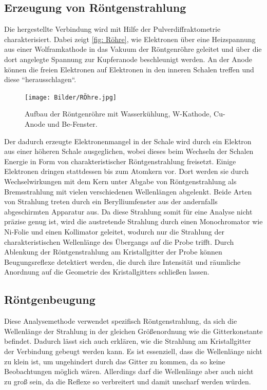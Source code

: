 \documentclass[a4paper,12pt,bibliography=totocnumbered]{scrartcl}
\begin{document}
\subsection{Erzeugung von Röntgenstrahlung}
Die hergestellte Verbindung wird mit Hilfe der Pulverdiffraktometrie charakterisiert.
Dabei zeigt \autoref{fig: Röhre}, wie Elektronen über eine Heizspannung aus einer Wolframkathode in das Vakuum der Röntgenröhre geleitet und über die dort angelegte Spannung zur Kupferanode beschleunigt werden.
An der Anode können die freien Elektronen auf Elektronen in den inneren Schalen treffen und diese ``herausschlagen``. \cite{Kristallgitter}
\begin{figure}[H]
    \centering
    \texttt{[image: Bilder/RÖhre.jpg]}
    \caption{Aufbau der Röntgenröhre mit Wasserkühlung, W-Kathode, Cu-Anode und Be-Fenster. \cite{Kristallgitter}}
    \label{fig: Röhre}
\end{figure}
Der dadurch erzeugte Elektronenmangel in der Schale wird durch ein Elektron aus einer höheren Schale ausgeglichen, wobei dieses beim Wechseln der Schalen Energie in Form von charakteristischer Röntgenstrahlung freisetzt. 
Einige Elektronen dringen stattdessen bis zum Atomkern vor. 
Dort werden sie durch Wechselwirkungen mit dem Kern unter Abgabe von Röntgenstrahlung als Bremsstrahlung mit vielen verschiedenen Wellenlängen abgelenkt.
Beide Arten von Strahlung treten durch ein Berylliumfenster aus der andernfalls abgeschirmten Apparatur aus. 
\newpage
Da diese Strahlung somit für eine Analyse nicht präzise genug ist, wird die austretende Strahlung durch einen Monochromator wie Ni-Folie und einen Kollimator geleitet, wodurch nur die Strahlung der charakteristischen Wellenlänge des Übergangs auf die Probe trifft. 
Durch Ablenkung der Röntgenstrahlung am Kristallgitter der Probe können Beugungsreflexe detektiert werden, die durch ihre Intensität und räumliche Anordnung auf die Geometrie des Kristallgitters schließen lassen.

\subsection{Röntgenbeugung}
Diese Analysemethode verwendet spezifisch Röntgenstrahlung, da sich die Wellenlänge der Strahlung in der gleichen Größenordnung wie die Gitterkonstante befindet. \cite{Kristallgitter}
Dadurch lässt sich auch erklären, wie die Strahlung am Kristallgitter der Verbindung gebeugt werden kann.
Es ist essenziell, dass die Wellenlänge nicht zu klein ist, um ungehindert durch das Gitter zu kommen, da so keine Beobachtungen möglich wären.
Allerdings darf die Wellenlänge aber auch nicht zu groß sein, da die Reflexe so verbreitert und damit unscharf werden würden.
\end{document}
